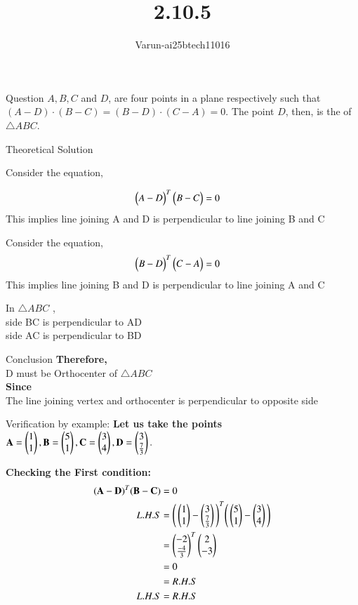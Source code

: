 \documentclass{beamer}
\title %
{2.10.5}
\author %
{Varun-ai25btech11016}
\begin{document}
\frame{\titlepage}
\begin{frame}{Question}
$A, B, C$ and $D$, are four points in a plane respectively such that 
$(A - D) \cdot (B - C) = (B - D) \cdot (C - A) = 0.$  
The point $D$, then, is the \underline{\hspace{1cm}} of $\triangle ABC$. 
\end{frame}



\begin{frame}{Theoretical Solution }

Consider the equation,

\begin{align}
\begin{pmatrix}A - D\end{pmatrix} ^{T} \begin{pmatrix}B - C\end{pmatrix}
&=0
\end{align}
This implies line joining A and D is perpendicular to line joining B and C


Consider the equation,
\begin{align}
\begin{pmatrix}B - D\end{pmatrix} ^{T} \begin{pmatrix}C - A\end{pmatrix}
&=0
\end{align}
This implies line joining B and D is perpendicular to line joining A and C

In $\triangle ABC$ ,\\
  side BC is perpendicular to AD\\
side AC is perpendicular to BD\\
\end{frame}
\begin{frame}{Conclusion}
\textbf{Therefore,}\\
D must be Orthocenter of $\triangle ABC$\\
\textbf{Since}\\
The line joining vertex and orthocenter is perpendicular to opposite side
\end{frame}
\begin{frame}{Verification by example:}
\textbf{Let us take the points}\\
$\mathbf{A}=\begin{pmatrix}1\\1\end{pmatrix},
\mathbf{B}=\begin{pmatrix}5\\1\end{pmatrix}, 
\mathbf{C}=\begin{pmatrix}3\\4\end{pmatrix}, 
\mathbf{D}=\begin{pmatrix}3\\\tfrac{7}{3}\end{pmatrix}.$


\textbf{Checking the First condition:}
\begin{align}
(\mathbf{A}- \mathbf{D} )^{T} (\mathbf{B}- \mathbf{C})
&=0\\
L.H.S&=\Bigg(\begin{pmatrix}1\\1\end{pmatrix}- \begin{pmatrix}3\\\tfrac{7}{3}\end{pmatrix}\Bigg )^{T} \Bigg(\begin{pmatrix}5\\1\end{pmatrix}- \begin{pmatrix}3\\4\end{pmatrix}\Bigg)\\
&=\begin{pmatrix}-2\\\tfrac{-4}{3}\end{pmatrix} ^{T} \begin{pmatrix}2\\-3\end{pmatrix}\\
&=0\\
&=R.H.S\\
L.H.S&=R.H.S
\end{align}
\end{frame}
\end{document}
